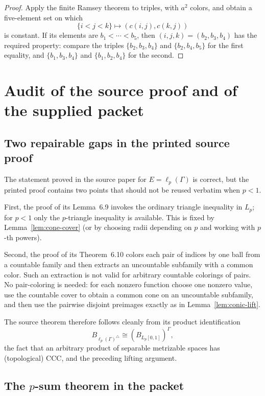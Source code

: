 \documentclass[11pt]{article}
\theoremstyle{definition}
\newcommand{\Lp}{L_p[0,1]}
\begin{document}
\begin{proof}
Apply the finite Ramsey theorem to triples, with $a^2$ colors, and obtain a
five-element set on which
\[
 \{i<j<k\}\longmapsto(c(i,j),c(k,j))
\]
is constant.  If its elements are $b_1<\cdots<b_5$, then
$(i,j,k)=(b_2,b_3,b_4)$ has the required property: compare the triples
$\{b_2,b_3,b_4\}$ and $\{b_2,b_4,b_5\}$ for the first equality, and
$\{b_1,b_3,b_4\}$ and $\{b_1,b_2,b_4\}$ for the second.
\end{proof}

\section{Audit of the source proof and of the supplied packet}

\subsection{Two repairable gaps in the printed source proof}

The statement proved in the source paper for $E=\ell_p(\Gamma)$ is correct,
but the printed proof contains two points that should not be reused verbatim
when $p<1$.

First, the proof of its Lemma~6.9 invokes the ordinary triangle inequality in
$L_p$; for $p<1$ only the $p$-triangle inequality is available.  This is fixed by
Lemma~\ref{lem:cone-cover} (or by choosing radii depending on $p$ and working
with $p$-th powers).

Second, the proof of its Theorem~6.10 colors each pair of indices by one ball
from a countable family and then extracts an uncountable subfamily with a common
color.  Such an extraction is not valid for arbitrary countable colorings of
pairs.  No pair-coloring is needed: for each nonzero function choose one nonzero
value, use the countable cover to obtain a common cone on an uncountable
subfamily, and then use the pairwise disjoint preimages exactly as in
Lemma~\ref{lem:conic-lift}.

The source theorem therefore follows cleanly from its product identification
\[
 B_{\ell_p(\Gamma)^\triangle}\cong (B_{\Lp})^\Gamma,
\]
the fact that an arbitrary product of separable metrizable spaces has
(topological) CCC, and the preceding lifting argument.

\subsection{The $p$-sum theorem in the packet}
\end{document}
